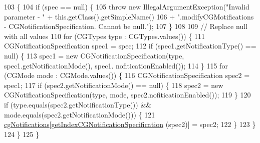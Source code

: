 \begin{DoxyCode}
103                                                                        \{
104     \textcolor{keywordflow}{if} (spec == null) \{
105       \textcolor{keywordflow}{throw} \textcolor{keyword}{new} IllegalArgumentException(\textcolor{stringliteral}{"Invalid parameter - "} + this.getClass().getSimpleName()
106           + \textcolor{stringliteral}{".modifyCGMotifications - CGNotificationSpecification. Cannot be null."});
107     \}
108 
109     \textcolor{comment}{// Replace null with all values}
110     \textcolor{keywordflow}{for} (CGTypes type : CGTypes.values()) \{
111       CGNotificationSpecification spec1 = spec;
112       \textcolor{keywordflow}{if} (spec1.getNotificationType() == null) \{
113         spec1 = \textcolor{keyword}{new} CGNotificationSpecification(type, spec1.getNotificationMode(), spec1.
      nofiticationEnabled());
114       \}
115       \textcolor{keywordflow}{for} (CGMode mode : CGMode.values()) \{
116         CGNotificationSpecification spec2 = spec1;
117         \textcolor{keywordflow}{if} (spec2.getNotificationMode() == null) \{
118           spec2 = \textcolor{keyword}{new} CGNotificationSpecification(type, mode, spec2.nofiticationEnabled());
119         \}
120         \textcolor{keywordflow}{if} (type.equals(spec2.getNotificationType()) && mode.equals(spec2.getNotificationMode())) \{
121           \hyperlink{classgov_1_1nasa_1_1jpf_1_1inspector_1_1server_1_1choicegenerators_1_1_choice_generators_manager_ab6f3e1ad030f6d5af4314d1c27829fa0}{cgNotifications}[\hyperlink{classgov_1_1nasa_1_1jpf_1_1inspector_1_1server_1_1choicegenerators_1_1_choice_generators_manager_a38613d9107860e047acb350d21a0a69d}{getIndexCGNotificationSpecification}
      (spec2)] = spec2;
122         \}
123       \}
124     \}
125   \}
\end{DoxyCode}
